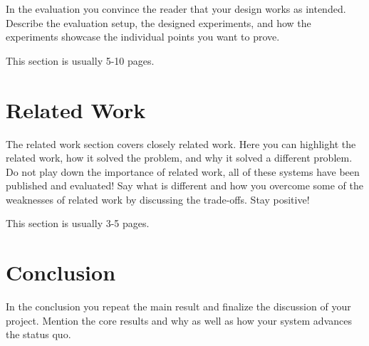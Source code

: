 \documentclass[a4paper,12pt,oneside]{report}
\begin{document}
In the evaluation you convince the reader that your design works as intended.
Describe the evaluation setup, the designed experiments, and how the
experiments showcase the individual points you want to prove.

This section is usually 5-10 pages.


\chapter{Related Work}

The related work section covers closely related work. Here you can highlight
the related work, how it solved the problem, and why it solved a different
problem. Do not play down the importance of related work, all of these
systems have been published and evaluated! Say what is different and how
you overcome some of the weaknesses of related work by discussing the 
trade-offs. Stay positive!

This section is usually 3-5 pages.


\chapter{Conclusion}

In the conclusion you repeat the main result and finalize the discussion of
your project. Mention the core results and why as well as how your system
advances the status quo.

\cleardoublepage
{}
{}
\printbibliography

%
%
\end{document}
